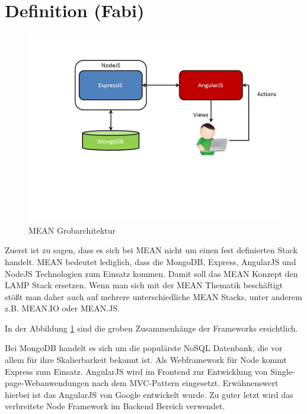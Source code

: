 \section{Definition (Fabi)}
\label{definition-fabi}

\begin{figure}[h]
	\centering
	\includegraphics[width=0.7\linewidth]{figures/mean-grobarchitektur.png}
	\caption{MEAN Grobarchitektur}
	\label{f:mean-grobarchitektur}
\end{figure}

Zuerst ist zu sagen, dass es sich bei MEAN nicht um einen fest definierten Stack handelt. MEAN bedeutet lediglich, dass die MongoDB, Express, AngularJS und NodeJS Technologien zum Einsatz kommen. Damit soll das MEAN Konzept den LAMP Stack ersetzen. Wenn man sich mit der MEAN Thematik beschäftigt stößt man daher auch auf mehrere unterschiedliche MEAN Stacks, unter anderem z.B. MEAN.IO oder MEAN.JS.

In der Abbildung \ref{f:mean-grobarchitektur} sind die groben Zusammenhänge der Frameworks ersichtlich.

Bei MongoDB handelt es sich um die populärste NoSQL Datenbank, die vor allem für ihre Skalierbarkeit bekannt ist. Als Webframework für Node kommt Express zum Einsatz. AngularJS wird im Frontend zur Entwicklung von Single-page-Webanwendungen nach dem MVC-Pattern eingesetzt. Erwähnenswert hierbei ist das AngularJS von Google entwickelt wurde. Zu guter letzt wird das verbreitete Node Framework im Backend Bereich verwendet.
